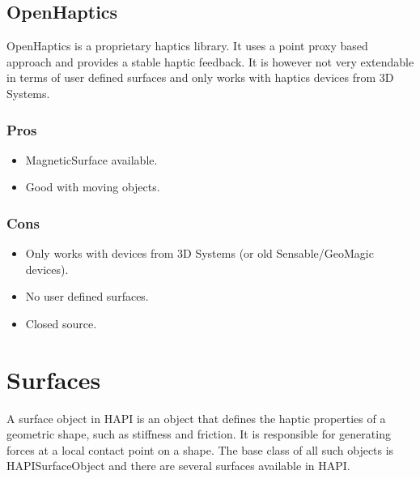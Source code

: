 \subsection{OpenHaptics}
OpenHaptics \cite{openhaptics} is a proprietary haptics library. It uses a point proxy based approach and provides a stable haptic feedback. It is however not very extendable in terms of user defined surfaces and only works with haptics devices from 3D Systems.

\begin{minipage}[t]{3in}
\subsubsection{Pros}
\begin{itemize}
\item MagneticSurface available.
\item Good with moving objects.
\end{itemize}
\end{minipage}
\begin{minipage}[t]{3in}
\subsubsection{Cons}
\begin{itemize}
\item Only works with devices from 3D Systems (or old Sensable/GeoMagic devices).
\item No user defined surfaces.
\item Closed source.
\end{itemize}
\end{minipage}


\section{Surfaces}
A surface object in HAPI is an object that defines the haptic properties of a geometric shape, such as stiffness and friction. It is responsible for generating forces at a local contact point on a shape. The base class of all such objects is HAPISurfaceObject and there are several surfaces available in HAPI. 

